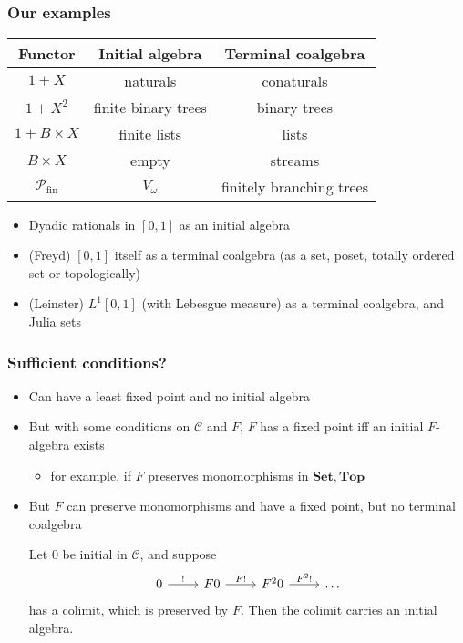 \documentclass{beamer}
\newcommand{\cc}{\mathscr{C}}
\begin{document}
\subsection{}
\begin{frame}
  \frametitle{Our examples}
  \begin{table}
    \begin{tabular}{c | c | c}
    Functor & Initial algebra & Terminal coalgebra \\
    \hline \hline
    $1 + X$ & naturals & conaturals \\
    $1 + X^2$ & finite binary trees & binary trees \\
    $1 + B \times X$ & finite lists & lists \\
    $B \times X$ & empty & streams \\
    $\mathcal{P}_{\text{fin}}$ & $V_\omega$ & finitely branching trees
    \end{tabular}
  \end{table}
  \pause
  \begin{itemize}[<+->]
    \item Dyadic rationals in $[0,1]$ as an initial algebra
    \item (Freyd) $[0,1]$ itself as a terminal coalgebra (as a set, poset, totally ordered set or topologically)
    \item (Leinster) $L^1[0,1]$ (with Lebesgue measure) as a terminal coalgebra, and Julia sets
  \end{itemize}
\end{frame}
\begin{frame}
  \frametitle{Sufficient conditions?}
  \begin{itemize}[<+->]
    \item Can have a least fixed point and no initial algebra
    \item But with some conditions on $\cc$ and $F$, $F$ has a fixed point iff an initial $F$-algebra exists
      \begin{itemize}
        \item for example, if $F$ preserves monomorphisms in $\mathbf{Set}, \mathbf{Top}$
      \end{itemize}
    \item But $F$ can preserve monomorphisms and have a fixed point, but no terminal coalgebra
      \begin{theorem}[Ad\'amek]
        Let $0$ be initial in $\cc$, and suppose
        \begin{equation*}
          \begin{tikzcd}[ampersand replacement=\&]
            0 \rar{!} \& F0 \rar{F!} \& F^2 0 \rar{F^2 !} \& \dots
          \end{tikzcd}
        \end{equation*}
        has a colimit, which is preserved by $F$. Then the colimit carries an initial algebra.
      \end{theorem}
  \end{itemize}
\end{frame}
\end{document}
